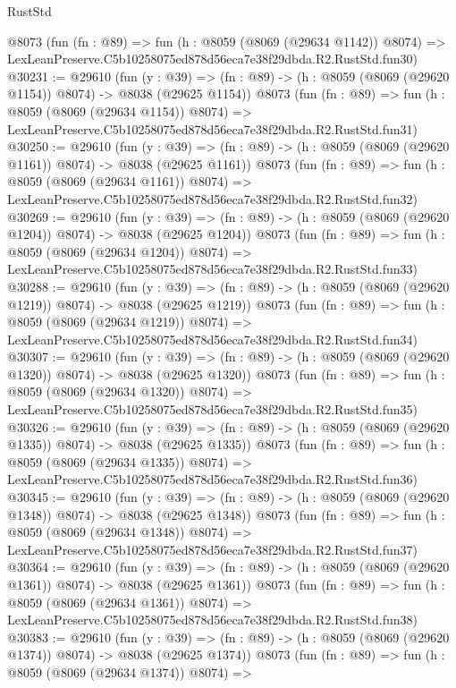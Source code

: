 \begin{lexlean}{RustStd}
\begin{coremodule}
    @8073
    (fun (fn : @89) =>
    fun (h : @8059 (@8069 (@29634 @1142)) @8074) =>
    LexLeanPreserve.C5b10258075ed878d56eca7e38f29dbda.R2.RustStd.fun30)
@30231 := @29610
    (fun (y : @39) =>
    (fn : @89) -> (h : @8059 (@8069 (@29620 @1154)) @8074) -> @8038 (@29625 @1154))
    @8073
    (fun (fn : @89) =>
    fun (h : @8059 (@8069 (@29634 @1154)) @8074) =>
    LexLeanPreserve.C5b10258075ed878d56eca7e38f29dbda.R2.RustStd.fun31)
@30250 := @29610
    (fun (y : @39) =>
    (fn : @89) -> (h : @8059 (@8069 (@29620 @1161)) @8074) -> @8038 (@29625 @1161))
    @8073
    (fun (fn : @89) =>
    fun (h : @8059 (@8069 (@29634 @1161)) @8074) =>
    LexLeanPreserve.C5b10258075ed878d56eca7e38f29dbda.R2.RustStd.fun32)
@30269 := @29610
    (fun (y : @39) =>
    (fn : @89) -> (h : @8059 (@8069 (@29620 @1204)) @8074) -> @8038 (@29625 @1204))
    @8073
    (fun (fn : @89) =>
    fun (h : @8059 (@8069 (@29634 @1204)) @8074) =>
    LexLeanPreserve.C5b10258075ed878d56eca7e38f29dbda.R2.RustStd.fun33)
@30288 := @29610
    (fun (y : @39) =>
    (fn : @89) -> (h : @8059 (@8069 (@29620 @1219)) @8074) -> @8038 (@29625 @1219))
    @8073
    (fun (fn : @89) =>
    fun (h : @8059 (@8069 (@29634 @1219)) @8074) =>
    LexLeanPreserve.C5b10258075ed878d56eca7e38f29dbda.R2.RustStd.fun34)
@30307 := @29610
    (fun (y : @39) =>
    (fn : @89) -> (h : @8059 (@8069 (@29620 @1320)) @8074) -> @8038 (@29625 @1320))
    @8073
    (fun (fn : @89) =>
    fun (h : @8059 (@8069 (@29634 @1320)) @8074) =>
    LexLeanPreserve.C5b10258075ed878d56eca7e38f29dbda.R2.RustStd.fun35)
@30326 := @29610
    (fun (y : @39) =>
    (fn : @89) -> (h : @8059 (@8069 (@29620 @1335)) @8074) -> @8038 (@29625 @1335))
    @8073
    (fun (fn : @89) =>
    fun (h : @8059 (@8069 (@29634 @1335)) @8074) =>
    LexLeanPreserve.C5b10258075ed878d56eca7e38f29dbda.R2.RustStd.fun36)
@30345 := @29610
    (fun (y : @39) =>
    (fn : @89) -> (h : @8059 (@8069 (@29620 @1348)) @8074) -> @8038 (@29625 @1348))
    @8073
    (fun (fn : @89) =>
    fun (h : @8059 (@8069 (@29634 @1348)) @8074) =>
    LexLeanPreserve.C5b10258075ed878d56eca7e38f29dbda.R2.RustStd.fun37)
@30364 := @29610
    (fun (y : @39) =>
    (fn : @89) -> (h : @8059 (@8069 (@29620 @1361)) @8074) -> @8038 (@29625 @1361))
    @8073
    (fun (fn : @89) =>
    fun (h : @8059 (@8069 (@29634 @1361)) @8074) =>
    LexLeanPreserve.C5b10258075ed878d56eca7e38f29dbda.R2.RustStd.fun38)
@30383 := @29610
    (fun (y : @39) =>
    (fn : @89) -> (h : @8059 (@8069 (@29620 @1374)) @8074) -> @8038 (@29625 @1374))
    @8073
    (fun (fn : @89) =>
    fun (h : @8059 (@8069 (@29634 @1374)) @8074) =>

\end{coremodule}
\end{lexlean}
